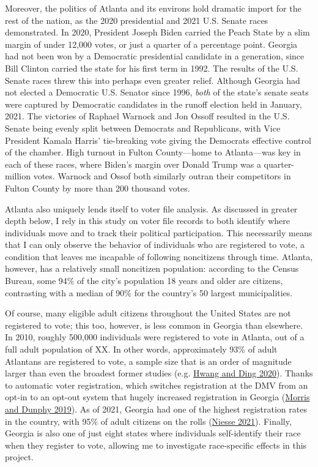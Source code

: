 \documentclass[
  12pt,
]{article}
\begin{document}
Moreover, the politics of Atlanta and its environs hold dramatic import for the rest of the nation, as the 2020 presidential and 2021 U.S. Senate races demonstrated. In 2020, President Joseph Biden carried the Peach State by a slim margin of under 12,000 votes, or just a quarter of a percentage point. Georgia had not been won by a Democratic presidential candidate in a generation, since Bill Clinton carried the state for his first term in 1992. The results of the U.S. Senate races threw this into perhaps even greater relief. Although Georgia had not elected a Democratic U.S. Senator since 1996, \emph{both} of the state's senate seats were captured by Democratic candidates in the runoff election held in January, 2021. The victories of Raphael Warnock and Jon Ossoff resulted in the U.S. Senate being evenly split between Democrats and Republicans, with Vice President Kamala Harris' tie-breaking vote giving the Democrats effective control of the chamber. High turnout in Fulton County---home to Atlanta---was key in each of these races, where Biden's margin over Donald Trump was a quarter-million votes. Warnock and Ossof both similarly outran their competitors in Fulton County by more than 200 thousand votes.

Atlanta also uniquely lends itself to voter file analysis. As discussed in greater depth below, I rely in this study on voter file records to both identify where individuals move and to track their political participation. This necessarily means that I can only observe the behavior of individuals who are registered to vote, a condition that leaves me incapable of following noncitizens through time. Atlanta, however, has a relatively small noncitizen population: according to the Census Bureau, some 94\% of the city's population 18 years and older are citizens, contrasting with a median of 90\% for the country's 50 largest municipalities.

Of course, many eligible adult citizens throughout the United States are not registered to vote; this too, however, is less common in Georgia than elsewhere. In 2010, roughly 500,000 individuals were registered to vote in Atlanta, out of a full adult population of XX. In other words, approximately 93\% of adult Atlantans are registered to vote, a sample size that is an order of magnitude larger than even the broadest former studies (e.g. \protect\hyperlink{ref-Hwang2020}{Hwang and Ding 2020}). Thanks to automatic voter registration, which switches registration at the DMV from an opt-in to an opt-out system that hugely increased registration in Georgia (\protect\hyperlink{ref-Morris2019a}{Morris and Dunphy 2019}). As of 2021, Georgia had one of the highest registration rates in the country, with 95\% of adult citizens on the rolls (\protect\hyperlink{ref-Niesse2021a}{Niesse 2021}). Finally, Georgia is also one of just eight states where individuals self-identify their race when they register to vote, allowing me to investigate race-specific effects in this project.
\end{document}
